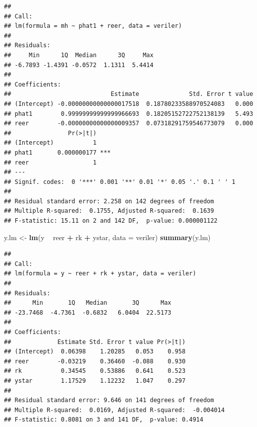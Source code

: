 \documentclass[]{article}
\newenvironment{Shaded}{\begin{snugshade}}{\end{snugshade}}
\newcommand{\KeywordTok}[1]{\textcolor[rgb]{0.13,0.29,0.53}{\textbf{#1}}}
\newcommand{\DataTypeTok}[1]{\textcolor[rgb]{0.13,0.29,0.53}{#1}}
\newcommand{\StringTok}[1]{\textcolor[rgb]{0.31,0.60,0.02}{#1}}
\newcommand{\OperatorTok}[1]{\textcolor[rgb]{0.81,0.36,0.00}{\textbf{#1}}}
\newcommand{\NormalTok}[1]{#1}
\begin{document}
\begin{Shaded}
\end{Shaded}

\begin{verbatim}
## 
## Call:
## lm(formula = mh ~ phat1 + reer, data = veriler)
## 
## Residuals:
##     Min      1Q  Median      3Q     Max 
## -6.7893 -1.4391 -0.0572  1.1311  5.4414 
## 
## Coefficients:
##                            Estimate              Std. Error t value
## (Intercept) -0.00000000000000017518  0.18780233588970524083   0.000
## phat1        0.99999999999999966693  0.18205152722752138139   5.493
## reer        -0.00000000000000009357  0.07318291759546773079   0.000
##                Pr(>|t|)    
## (Intercept)           1    
## phat1       0.000000177 ***
## reer                  1    
## ---
## Signif. codes:  0 '***' 0.001 '**' 0.01 '*' 0.05 '.' 0.1 ' ' 1
## 
## Residual standard error: 2.258 on 142 degrees of freedom
## Multiple R-squared:  0.1755, Adjusted R-squared:  0.1639 
## F-statistic: 15.11 on 2 and 142 DF,  p-value: 0.000001122
\end{verbatim}

\begin{Shaded}
\begin{Highlighting}[]
\NormalTok{y.lm <-}\StringTok{ }\KeywordTok{lm}\NormalTok{(y }\OperatorTok{~}\StringTok{ }\NormalTok{reer }\OperatorTok{+}\StringTok{ }\NormalTok{rk }\OperatorTok{+}\StringTok{ }\NormalTok{ystar, }\DataTypeTok{data =}\NormalTok{ veriler)}
\KeywordTok{summary}\NormalTok{(y.lm)}
\end{Highlighting}
\end{Shaded}

\begin{verbatim}
## 
## Call:
## lm(formula = y ~ reer + rk + ystar, data = veriler)
## 
## Residuals:
##      Min       1Q   Median       3Q      Max 
## -23.7468  -4.7361  -0.6832   6.0404  22.5173 
## 
## Coefficients:
##             Estimate Std. Error t value Pr(>|t|)
## (Intercept)  0.06398    1.20285   0.053    0.958
## reer        -0.03219    0.36460  -0.088    0.930
## rk           0.34545    0.53886   0.641    0.523
## ystar        1.17529    1.12232   1.047    0.297
## 
## Residual standard error: 9.646 on 141 degrees of freedom
## Multiple R-squared:  0.0169, Adjusted R-squared:  -0.004014 
## F-statistic: 0.8081 on 3 and 141 DF,  p-value: 0.4914
\end{verbatim}
\end{document}
